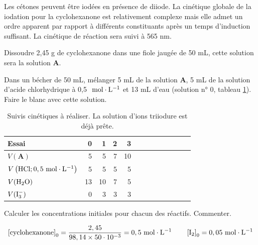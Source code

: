 \documentclass[twoside,a4paper,11pt,answers]{exam}
\begin{document}
\begin{questions}
{Les cétones peuvent être iodées en présence de diiode. La cinétique globale de la iodation pour la cyclohexanone est relativement complexe mais elle admet un ordre apparent par rapport à différents constituants après un temps d'induction suffisant. La cinétique de réaction sera suivi à 565 nm.

\bigskip
Dissoudre 2,45 g de cyclohexanone dans une fiole jaugée de 50 mL, cette solution sera la solution \textbf{A}. 

Dans un bécher de 50 mL, mélanger 5 mL de la solution \textbf{A}, 5 mL de la solution d'acide chlorhydrique à 0,5 $~\mathrm{mol \cdot L^{-1}}$ et 13 mL d'eau (solution n° 0, tableau \ref{tab:cin}). Faire le blanc avec cette solution.

}

\begin{table}[htbp]
\centering
\begin{tabular}{lrrrrrrrrrrrr}
\toprule
Essai & 0 & 1 & 2 & 3 \\
\midrule
$V(\mathbf{A})$ & 5 & 5 & 7 & 10 \\
$V\left(\mathrm{HCl}; 0,5 ~\mathrm{mol \cdot L^{-1}} \right)$ & 5 & 5 & 5 & 5 \\
$V(\mathrm{H_2O})$ & 13 & 10 & 7 & 5 \\
$V(\mathrm{I_3^{-}})$& 0 & 3 & 3 & 3  \\ 
\bottomrule
\end{tabular}
\caption{Suivis cinétiques à réaliser. La solution d'ions triiodure est déjà prête.}
\label{tab:cin}
\end{table}


\begin{framed}
\question  Calculer les concentrations initiales pour chacun des réactifs. Commenter.
\begin{solution}[6cm]
 \begin{align}
\left[\mathrm{cyclohexanone}\right]_{0}=\dfrac{2,45}{98,14\times 50\cdot 10^{-3}}=0,5 ~\mathrm{mol \cdot L^{-1}} \qquad \left[\mathrm{I_2}\right]_0=0,05 ~\mathrm{mol \cdot L^{-1}}
\end{align}


\end{solution}
\end{framed}
\end{questions}
\end{document}
